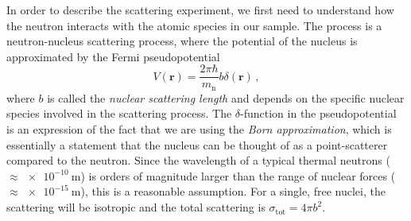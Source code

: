 In order to describe the scattering experiment, we first need to understand how the neutron interacts with the atomic species in our sample. The process is a neutron-nucleus scattering process, where the potential of the nucleus is approximated by the Fermi pseudopotential
%
\begin{equation}\label{eq:fermi_pseudopotential}
V(\bm{r}) = \frac{2\pi \hbar}{m_\text{n}} b \delta (\bm{r}) \, ,
\end{equation}
%
where $b$ is called the \emph{nuclear scattering length} and depends on the specific nuclear species involved in the scattering process. The $\delta$-function in the pseudopotential is an expression of the fact that we are using the \emph{Born approximation}, which is essentially a statement that the nucleus can be thought of as a point-scatterer compared to the neutron. Since the wavelength of a typical thermal neutrons ($\approx \SI{e-10}{\meter}$) is orders of magnitude larger than the range of nuclear forces ($\approx \SI{e-15}{\meter}$), this is a reasonable assumption. For a single, free nuclei, the scattering will be isotropic and the total scattering is $\sigma_\text{tot} = 4\pi b^2$.

